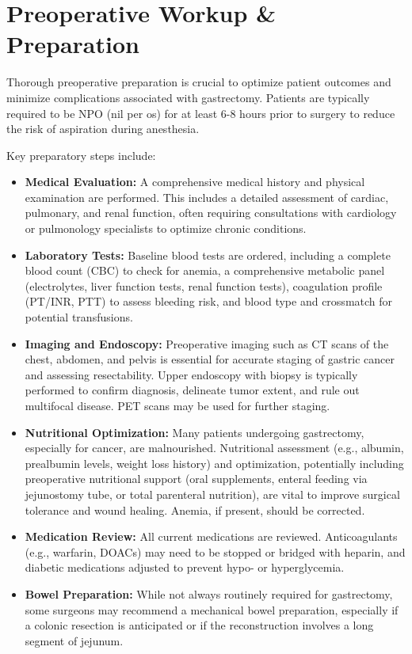 \section*{Preoperative Workup \& Preparation}
Thorough preoperative preparation is crucial to optimize patient outcomes and minimize complications associated with gastrectomy. Patients are typically required to be NPO (nil per os) for at least 6-8 hours prior to surgery to reduce the risk of aspiration during anesthesia.

Key preparatory steps include:
\begin{itemize}
  \item \textbf{Medical Evaluation:} A comprehensive medical history and physical examination are performed. This includes a detailed assessment of cardiac, pulmonary, and renal function, often requiring consultations with cardiology or pulmonology specialists to optimize chronic conditions.
  \item \textbf{Laboratory Tests:} Baseline blood tests are ordered, including a complete blood count (CBC) to check for anemia, a comprehensive metabolic panel (electrolytes, liver function tests, renal function tests), coagulation profile (PT/INR, PTT) to assess bleeding risk, and blood type and crossmatch for potential transfusions.
  \item \textbf{Imaging and Endoscopy:} Preoperative imaging such as CT scans of the chest, abdomen, and pelvis is essential for accurate staging of gastric cancer and assessing resectability. Upper endoscopy with biopsy is typically performed to confirm diagnosis, delineate tumor extent, and rule out multifocal disease. PET scans may be used for further staging.
  \item \textbf{Nutritional Optimization:} Many patients undergoing gastrectomy, especially for cancer, are malnourished. Nutritional assessment (e.g., albumin, prealbumin levels, weight loss history) and optimization, potentially including preoperative nutritional support (oral supplements, enteral feeding via jejunostomy tube, or total parenteral nutrition), are vital to improve surgical tolerance and wound healing. Anemia, if present, should be corrected.
  \item \textbf{Medication Review:} All current medications are reviewed. Anticoagulants (e.g., warfarin, DOACs) may need to be stopped or bridged with heparin, and diabetic medications adjusted to prevent hypo- or hyperglycemia.
  \item \textbf{Bowel Preparation:} While not always routinely required for gastrectomy, some surgeons may recommend a mechanical bowel preparation, especially if a colonic resection is anticipated or if the reconstruction involves a long segment of jejunum.

\end{itemize}
